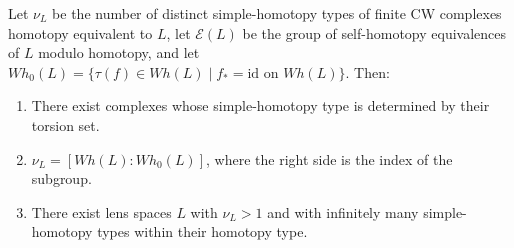 Let $\nu_L$ be the number of distinct simple-homotopy types of finite CW complexes homotopy equivalent to $L$, let $\mathcal{E}(L)$ be the group of self-homotopy equivalences of $L$ modulo homotopy, and let $Wh_0(L) = \{\tau(f) \in Wh(L) \mid f_* = \text{id on } Wh(L)\}$. Then:
\begin{enumerate}
\item[(1)] There exist complexes whose simple-homotopy type is determined by their torsion set.
\item[(2)] $\nu_L = [Wh(L) : Wh_0(L)]$, where the right side is the index of the subgroup.
\item[(3)] There exist lens spaces $L$ with $\nu_L > 1$ and with infinitely many simple-homotopy types within their homotopy type.
\end{enumerate}

